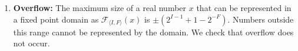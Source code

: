 \documentclass[runningheads,a4paper]{llncs}
\newcommand{\mat}[1]{\boldsymbol{#1}}
\begin{document}
\begin{enumerate}
\item {\bf Overflow:}
The maximum size of a real number $x$ that can be represented in a fixed point domain as $\mathcal{F}_{\langle I,F \rangle}(x)$ is $\pm (2^{I-1}+1-2^{-F})$. Numbers outside this range cannot be represented by the domain. We check that overflow does not occur.

\end{enumerate}



\end{document}
